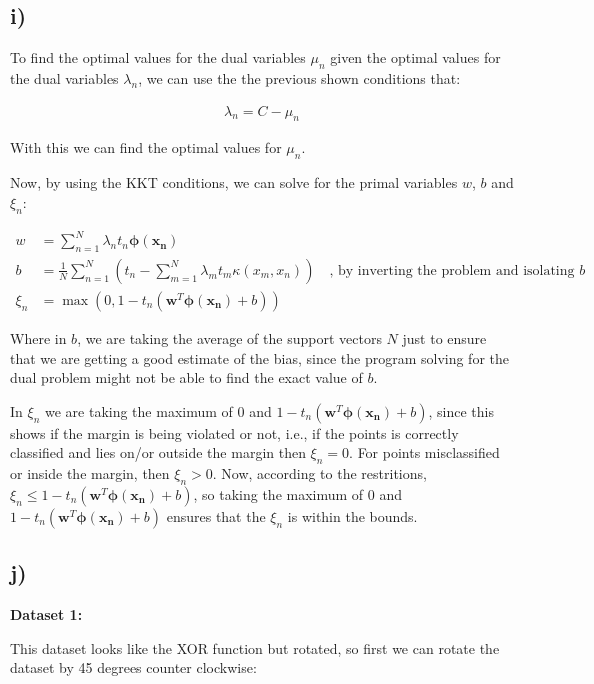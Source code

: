 \documentclass[12pt,a4paper,oneside]{paper}
\begin{document}
\newpage
\subsection*{i)}

To find the optimal values for the dual variables $\mu_n$ given the optimal values for the dual variables $\lambda_n$, we can use the the previous shown conditions that: 

\begin{align*}
    \lambda_n = C - \mu_n
\end{align*}

With this we can find the optimal values for $\mu_n$.

Now, by using the KKT conditions, we can solve for the primal variables $w$, $b$ and $\xi_n$:

\begin{align*}
    w &= \sum_{n=1}^{N} \lambda_n t_n \bm{\phi(x_n)} \\
    b &= \frac{1}{N} \sum_{n=1}^{N} \left( t_n - \sum_{m=1}^{N} \lambda_m t_m \kappa (x_m, x_n) \right) \quad \text{, by inverting the problem and isolating $b$} \\
    \xi_n &= \max(0, 1 - t_n (\bm{w}^T \bm{\phi(x_n)} + b))
\end{align*}

Where in $b$, we are taking the average of the support vectors $N$ just to ensure that we are getting a good estimate of the bias, 
since the program solving for the dual problem might not be able to find the exact value of $b$.

In $\xi_n$ we are taking the maximum of $0$ and $1 - t_n (\bm{w}^T \bm{\phi(x_n)} + b)$, since this shows if the margin
is being violated or not, i.e., if the points is correctly classified and lies on/or outside the margin
then $\xi_n = 0$. For points misclassified or inside the margin, then $\xi_n > 0$. Now, according to the restritions,
$\xi_n \leq 1 - t_n (\bm{w}^T \bm{\phi(x_n)} + b)$, so taking the maximum of $0$ and $1 - t_n (\bm{w}^T \bm{\phi(x_n)} + b)$ ensures that
the $\xi_n$ is within the bounds.

\newpage
\subsection*{j)}

\textbf{Dataset 1:}

This dataset looks like the XOR function but rotated, so first we can rotate the dataset by 45 degrees counter clockwise:
\end{document}
